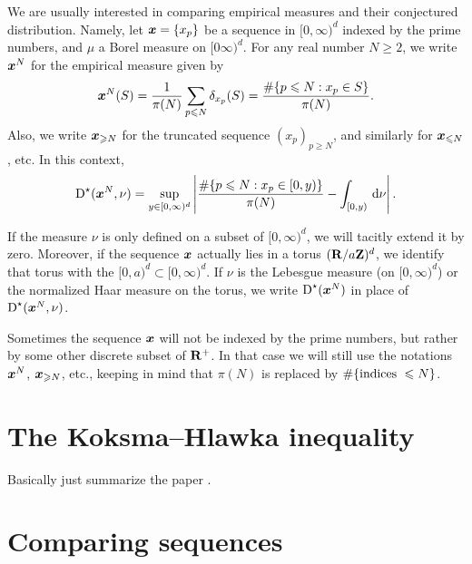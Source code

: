 We are usually interested in comparing empirical measures and their conjectured 
distribution. Namely, let ${\boldsymbol x} = \{x_p\}$ be a sequence in $[0,\infty)^d$ 
indexed by the prime numbers, and $\mu$ a Borel measure on $[0\infty)^d$. For 
any real number $N\geqslant 2$, we write ${\boldsymbol x}^N$ for the empirical measure 
given by 
\[
	{\boldsymbol x}^N(S) = \frac{1}{\pi(N)} \sum_{p\leqslant N} \delta_{x_p}(S) = \frac{\# \{p\leqslant N : x_p\in S\}}{\pi(N)} .
\]
Also, we write ${\boldsymbol x}_{\geqslant N}$ for the truncated sequence 
$(x_p)_{p\geqslant N}$, and similarly for ${\boldsymbol x}_{\leqslant N}$, etc. In this 
context, 
\[
	\operatorname{D}^\star({\boldsymbol x}^N,\nu) = \sup_{y\in [0,\infty)^d} \left| \frac{\# \{p\leqslant N : x_p \in [0,y)\}}{\pi(N)} - \int_{[0,y)} \, \mathrm{d}\nu\right| .
\]

If the measure $\nu$ is only defined on a subset of $[0,\infty)^d$, we will 
tacitly extend it by zero. Moreover, if the sequence ${\boldsymbol x}$ actually lies in a 
torus $(\mathbf{R}/a \mathbf{Z})^d$, we identify that torus with the 
$[0,a)^d\subset [0,\infty)^d$. If $\nu$ is the Lebesgue measure (on 
$[0,\infty)^d$) or the normalized Haar measure on the torus, we write 
$\operatorname{D}^\star({\boldsymbol x}^N)$ in place of $\operatorname{D}^\star({\boldsymbol x}^N, \nu)$. 

Sometimes the sequence ${\boldsymbol x}$ will not be indexed by the prime numbers, but 
rather by some other discrete subset of $\mathbf{R}^+$. In that case we will still 
use the notations ${\boldsymbol x}^N$, ${\boldsymbol x}_{\geqslant N}$, etc., keeping in mind that 
$\pi(N)$ is replaced by $\#\{\textnormal{indices }\leqslant N\}$. 





\section{The Koksma--Hlawka inequality}

Basically just summarize the paper \cite{okten-1999}. 





\section{Comparing sequences}

